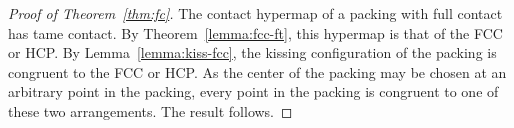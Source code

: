 \begin{proof}[Proof of Theorem~\ref{thm:fc}]  %
  The contact hypermap of a packing with full contact has tame
  contact.  By Theorem~\ref{lemma:fcc-ft}, this hypermap is that of
  the FCC or HCP.  By Lemma~\ref{lemma:kiss-fcc}, the kissing
  configuration of the packing is congruent to the FCC or HCP.  As the
  center of the packing may be chosen at an arbitrary point in the
  packing, every point in the packing is congruent to one of these two
  arrangements.  The result follows.
\end{proof}


